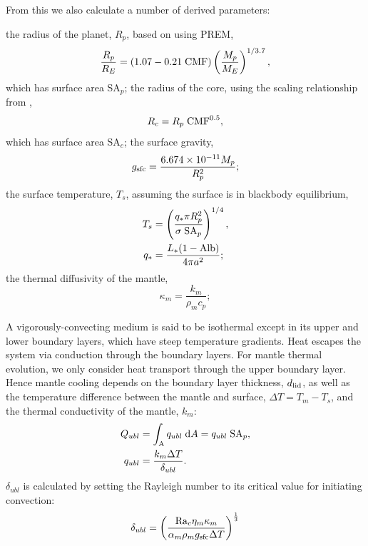 \documentclass[10pt,a4paper]{article}
\begin{document}
From this we also calculate a number of derived parameters:

the radius of the planet, $R_p$, based on \citet{Zeng2016} using PREM,
\begin{equation}
\frac{R_p}{R_E} = (1.07 - 0.21\; {\rm CMF})\left(\frac{M_p}{M_E}\right)^{1/3.7},
\end{equation}
which has surface area SA$_p$; the radius of the core, using the scaling relationship from \citet{Zeng2017},
\begin{equation}
R_c = R_p \; {\rm CMF}^{0.5},
\end{equation}
which has surface area SA$_c$; the surface gravity,
\begin{equation}
g_{\rm sfc} =\frac{6.674\times 10^{-11}M_p}{R_p^2};
\end{equation}
the surface temperature, $T_s$, assuming the surface is in blackbody equilibrium,
\begin{align}
T_s &= \left(\frac{q_* \pi R_p^2}{\sigma \; {\rm SA}_p}\right)^{1/4},\\
q_* &= \frac{L_*(1-{\rm Alb})}{4 \pi a^2};
\end{align}
the thermal diffusivity of the mantle,
\begin{equation}
\kappa_m = \frac{k_m}{\rho_m c_p};
\end{equation}

A vigorously-convecting medium is said to be isothermal except in its upper and lower boundary layers, which have steep temperature gradients.  Heat escapes the system via conduction through the boundary layers. For mantle thermal evolution, we only consider heat transport through the upper boundary layer. Hence mantle cooling depends on the boundary layer thickness, $d_{\rm lid}$, as well as the temperature difference between the mantle and surface, $\Delta T = T_m - T_s$, and the thermal conductivity of the mantle, $k_m$:
\begin{align}
Q_{ubl} &= \int_{\rm A} q_{ubl} \; {\rm d}A = q_{ubl} \; {\rm SA}_p,\\
q_{ubl} &= \frac{k_m \Delta T}{\delta_{ubl}}.
\label{eq:q_ubl}
\end{align}
$\delta_{ubl}$ is calculated by setting the Rayleigh number to its critical value for initiating convection:
\begin{equation}
\delta_{ubl} = \left(\frac{{\rm Ra}_c \eta_m \kappa_m}{\alpha_m \rho_m g_{\rm sfc} \Delta T}\right)^{\frac{1}{3}}
\label{eq:d_ubl}
\end{equation}
\end{document}

